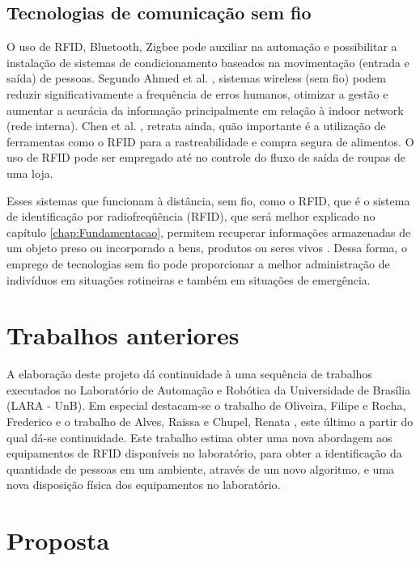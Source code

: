 \subsection{Tecnologias de comunicação sem fio}

O uso de RFID, Bluetooth, Zigbee pode auxiliar na automação e possibilitar a instalação de sistemas de condicionamento baseados na movimentação (entrada e saída) de pessoas. Segundo Ahmed et al. \cite{AhmedIntegrationStreamMapping}, sistemas wireless (sem fio) podem reduzir significativamente a frequência de erros humanos, otimizar a gestão e aumentar a acurácia da informação principalmente em relação à indoor network (rede interna). Chen et al. \cite{chenUsingRFID}, retrata ainda, quão importante é a utilização de ferramentas como o RFID para a rastreabilidade e compra segura de alimentos. O uso de RFID pode ser empregado até no controle do fluxo de saída de roupas de uma loja.

Esses sistemas que funcionam à distância, sem fio, como o RFID, que é o sistema de identificação por radiofreqüência (RFID), que será melhor explicado no capítulo \ref{chap:Fundamentacao}, permitem recuperar informações armazenadas de um objeto preso ou incorporado a bens, produtos ou seres vivos \cite{gutierrez2005complexo}. Dessa forma, o emprego de tecnologias sem fio pode proporcionar a melhor administração de indivíduos em situações rotineiras e também em situações de emergência. 

\section{Trabalhos anteriores}

A elaboração deste projeto dá continuidade à uma sequência de trabalhos executados no Laboratório de Automação e Robótica da Universidade de Brasília (LARA - UnB). Em especial destacam-se o trabalho de Oliveira, Filipe e Rocha, Frederico \cite{TG2013OliveiraERocha} e o trabalho de Alves, Raissa e Chupel, Renata \cite{TG2015RaissaERenata}, este último a partir do qual dá-se continuidade.
Este trabalho estima obter uma nova abordagem aos equipamentos de RFID disponíveis no laboratório, para obter a identificação da quantidade de pessoas em um ambiente, através de um novo algoritmo, e uma nova disposição física dos equipamentos no laboratório.

\section{Proposta}

